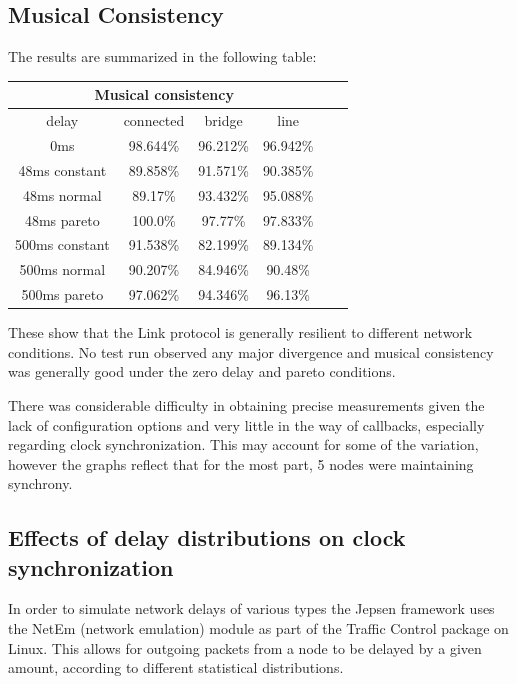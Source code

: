 \documentclass[11pt]{article} %
\theoremstyle{plain}
\theoremstyle{definition}
\begin{document}
\subsection{Musical Consistency}

The results are summarized in the following table:

\begin{center}
\begin{tabular}{|c|c|c|c|c|c|}
 \hline
  \multicolumn{4}{|c|}{Musical consistency} \\
 \hline
  delay & connected & bridge & line\\
 \hline
  0ms & 98.644\% & 96.212\% & 96.942\%\\
  48ms constant & 89.858\% & 91.571\% & 90.385\%\\
  48ms normal & 89.17\% & 93.432\% & 95.088\%\\
  48ms pareto & 100.0\% & 97.77\% & 97.833\%\\
  500ms constant & 91.538\% & 82.199\% & 89.134\%\\
  500ms normal & 90.207\% & 84.946\% & 90.48\%\\
  500ms pareto & 97.062\% & 94.346\% & 96.13\%\\
 \hline
\end{tabular}
\end{center}

These show that the Link protocol is generally resilient to different network
conditions. No test run observed any major divergence and musical consistency
was generally good under the zero delay and pareto conditions.

There was considerable difficulty in obtaining precise measurements given the
lack of configuration options and very little in the way of callbacks,
especially regarding clock synchronization. This may account for some of the
variation, however the graphs reflect that for the most part, 5 nodes were
maintaining synchrony.

\subsection{Effects of delay distributions on clock synchronization}

In order to simulate network delays of various types the Jepsen framework uses
the NetEm (network emulation) module as part of the Traffic Control package on
Linux\cite{hemminger2005network}. This allows for outgoing packets from a node
to be delayed by a given amount, according to different statistical
distributions.
\end{document}

